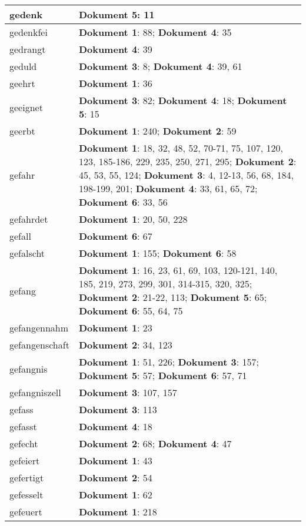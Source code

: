 \documentclass[a5paper]{article}
\begin{document}
\begin{longtable}[l]{|l|p{3in}|}
gedenk & \textbf{Dokument 5}: 11 \\
\hline
gedenkfei & \textbf{Dokument 1}: 88; \textbf{Dokument 4}: 35 \\
\hline
gedrangt & \textbf{Dokument 4}: 39 \\
\hline
geduld & \textbf{Dokument 3}: 8; \textbf{Dokument 4}: 39, 61 \\
\hline
geehrt & \textbf{Dokument 1}: 36 \\
\hline
geeignet & \textbf{Dokument 3}: 82; \textbf{Dokument 4}: 18; \textbf{Dokument 5}: 15 \\
\hline
geerbt & \textbf{Dokument 1}: 240; \textbf{Dokument 2}: 59 \\
\hline
gefahr & \textbf{Dokument 1}: 18, 32, 48, 52, 70-71, 75, 107, 120, 123, 185-186, 229, 235, 250, 271, 295; \textbf{Dokument 2}: 45, 53, 55, 124; \textbf{Dokument 3}: 4, 12-13, 56, 68, 184, 198-199, 201; \textbf{Dokument 4}: 33, 61, 65, 72; \textbf{Dokument 6}: 33, 56 \\
\hline
gefahrdet & \textbf{Dokument 1}: 20, 50, 228 \\
\hline
gefall & \textbf{Dokument 6}: 67 \\
\hline
gefalscht & \textbf{Dokument 1}: 155; \textbf{Dokument 6}: 58 \\
\hline
gefang & \textbf{Dokument 1}: 16, 23, 61, 69, 103, 120-121, 140, 185, 219, 273, 299, 301, 314-315, 320, 325; \textbf{Dokument 2}: 21-22, 113; \textbf{Dokument 5}: 65; \textbf{Dokument 6}: 55, 64, 75 \\
\hline
gefangennahm & \textbf{Dokument 1}: 23 \\
\hline
gefangenschaft & \textbf{Dokument 2}: 34, 123 \\
\hline
gefangnis & \textbf{Dokument 1}: 51, 226; \textbf{Dokument 3}: 157; \textbf{Dokument 5}: 57; \textbf{Dokument 6}: 57, 71 \\
\hline
gefangniszell & \textbf{Dokument 3}: 107, 157 \\
\hline
gefass & \textbf{Dokument 3}: 113 \\
\hline
gefasst & \textbf{Dokument 4}: 18 \\
\hline
gefecht & \textbf{Dokument 2}: 68; \textbf{Dokument 4}: 47 \\
\hline
gefeiert & \textbf{Dokument 1}: 43 \\
\hline
gefertigt & \textbf{Dokument 2}: 54 \\
\hline
gefesselt & \textbf{Dokument 1}: 62 \\
\hline
gefeuert & \textbf{Dokument 1}: 218 \\

\end{longtable}
\end{document}
